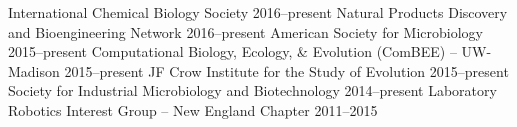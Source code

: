 

\begin{cvhonors}
  \cvhonor
    {International Chemical Biology Society} %
    {} %
    {2016--present} %
  \cvhonor
    {Natural Products Discovery and Bioengineering Network} %
    {} %
    {2016--present} %
  \cvhonor
    {American Society for Microbiology} %
    {} %
    {2015--present} %
  \cvhonor
    {Computational Biology, Ecology, \& Evolution (ComBEE) -- UW-Madison} %
    {} %
    {2015--present} %
  \cvhonor
    {JF Crow Institute for the Study of Evolution} %
    {} %
    {2015--present} %
  \cvhonor
    {Society for Industrial Microbiology and Biotechnology} %
    {} %
    {2014--present} %
  \cvhonor
    {Laboratory Robotics Interest Group -- New England Chapter} %
    {} %
    {2011--2015} %
\end{cvhonors}